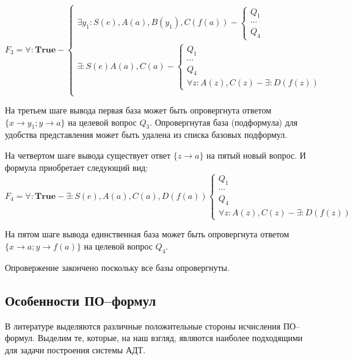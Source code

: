 \begin{example}
\begin{equation*}\label{ex:f3}
F_3 =
\forall:\boldsymbol{True} -
\left\lbrace
\begin{array}{l}
	\exists y_1\colon S(e),A(a),B(y_1),C(f(a)) -
	\left\lbrace
	\begin{array}{l}
		Q_1 \\ \cdots \\ Q_4
	\end{array}\right. \\
	\exists\colon S(e)A(a),C(a) -
	\left\lbrace
	\begin{array}{l}
		Q_1 \\ \cdots \\ Q_4 \\
		\forall z\colon A(z),C(z) - \exists\colon D(f(z))
	\end{array}\right. \\
\end{array}\right.
\end{equation*}

На третьем шаге вывода первая база может быть опровергнута ответом $\{x \rightarrow y_1; y \rightarrow a\}$ на целевой вопрос $Q_3$. Опровергнутая база (подформула) для удобства представления может быть удалена из списка базовых подформул.

На четвертом шаге вывода существует ответ $\{z \rightarrow a\}$ на пятый новый вопрос. И формула приобретает следующий вид:
\begin{equation*}\label{ex:f5}
	F_4 = \forall\colon\boldsymbol{True} - \exists\colon S(e),A(a), C(a),D(f(a))
	\left\lbrace
	\begin{array}{l}
		Q_1 \\ \cdots \\ Q_4 \\
		\forall z\colon A(z),C(z) - \exists\colon D(f(z))
	\end{array}\right.
\end{equation*}

На пятом шаге вывода единственная база может быть опровергнута ответом $\{x \rightarrow a; y \rightarrow f(a)\}$ на целевой вопрос $Q_4$.

Опровержение закончено поскольку все базы опровергнуты.

\end{example}


\subsection{Особенности ПО--формул}
В литературе выделяются различные положительные стороны исчисления ПО--формул. Выделим те, которые, на наш взгляд, являются наиболее подходящими для задачи построения системы АДТ.

